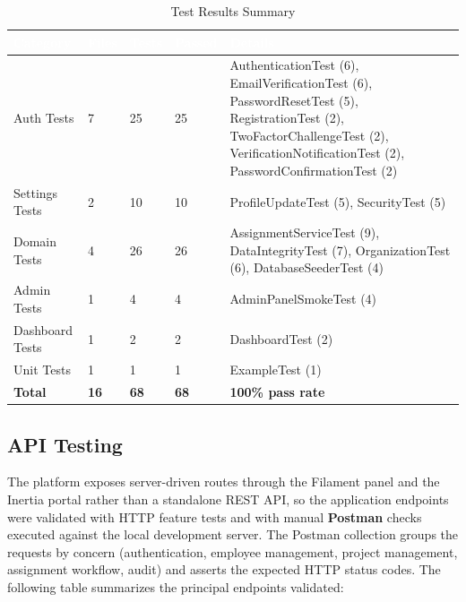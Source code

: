 \documentclass{bts-report}
\begin{document}
\begin{table}[H]
  \centering
  \caption{Test Results Summary}
  \vspace{0.2cm}
  \begin{tabularx}{\textwidth}{|l|l|l|l|X|}
    \hline
    \rowcolor{tableheader}
    \textcolor{white}{\textbf{Category}} & \textcolor{white}{\textbf{Files}} & \textcolor{white}{\textbf{Tests}} & \textcolor{white}{\textbf{Passed}} & \textcolor{white}{\textbf{Details}} \\
    \hline
    \rowcolor{white}
    Auth Tests & 7 & 25 & 25 & AuthenticationTest (6), EmailVerificationTest (6), PasswordResetTest (5), RegistrationTest (2), TwoFactorChallengeTest (2), VerificationNotificationTest (2), PasswordConfirmationTest (2) \\
    \hline
    \rowcolor{tablealt}
    Settings Tests & 2 & 10 & 10 & ProfileUpdateTest (5), SecurityTest (5) \\
    \hline
    \rowcolor{white}
    Domain Tests & 4 & 26 & 26 & AssignmentServiceTest (9), DataIntegrityTest (7), OrganizationTest (6), DatabaseSeederTest (4) \\
    \hline
    \rowcolor{tablealt}
    Admin Tests & 1 & 4 & 4 & AdminPanelSmokeTest (4) \\
    \hline
    \rowcolor{white}
    Dashboard Tests & 1 & 2 & 2 & DashboardTest (2) \\
    \hline
    \rowcolor{tablealt}
    Unit Tests & 1 & 1 & 1 & ExampleTest (1) \\
    \hline
    \rowcolor{white}
    \textbf{Total} & \textbf{16} & \textbf{68} & \textbf{68} & \textbf{100\% pass rate} \\
    \hline
  \end{tabularx}
\end{table}


\subsection{API Testing}
The platform exposes server-driven routes through the Filament panel and the Inertia portal rather than a standalone REST API, so the application endpoints were validated with HTTP feature tests and with manual \textbf{Postman} checks executed against the local development server. The Postman collection groups the requests by concern (authentication, employee management, project management, assignment workflow, audit) and asserts the expected HTTP status codes. The following table summarizes the principal endpoints validated:
\end{document}
